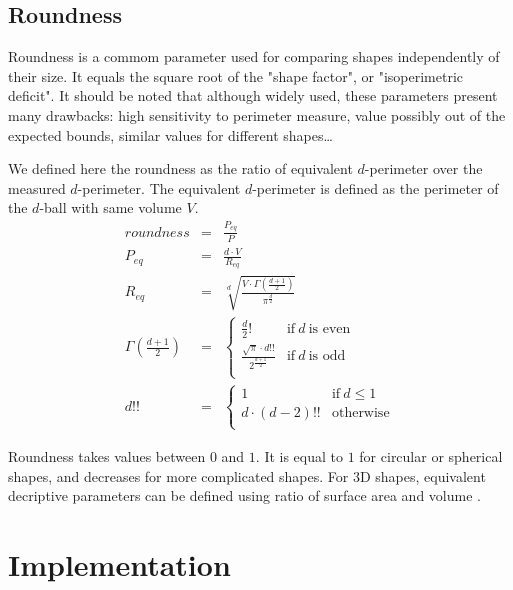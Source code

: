\documentclass{InsightArticle}
\begin{document}
\subsection{Roundness}

Roundness is a commom parameter used for comparing shapes independently of their size.
It equals the square root of the "shape factor", or "isoperimetric deficit".
It should be noted that although widely used, these parameters present many drawbacks: 
high sensitivity to perimeter measure, 
value possibly out of the expected bounds, similar values for different shapes\cite{Pirard2005}…

We defined here the roundness as the ratio of equivalent $d$-perimeter over the measured $d$-perimeter. 
The equivalent $d$-perimeter is defined as the perimeter of the $d$-ball with same volume $V$.
\begin{eqnarray}
roundness             & = & \frac{P_{eq}}{P} \\
P_{eq}                & = & \frac{d \cdot V}{R_{eq}} \\
R_{eq}                & = & \sqrt[\displaystyle d]{\frac{V\cdot\Gamma(\frac{d+1}{2})}{\pi^\frac{d}{2}}} \\
\Gamma(\frac{d+1}{2}) & = & \begin{cases}
                               \displaystyle \frac{d}{2}!  &\text{if}~ d ~\text{is even} \\
                               \displaystyle \frac{\sqrt{\pi} \cdot d!!}{2^{\frac{d+1}{2}}}  &\text{if}~ d ~\text{is odd} \\
                            \end{cases} \\
d!!                   & = & \begin{cases}
                                1 &\text{if}~ d \leq 1 \\
                                d \cdot (d-2)!!  & \text{otherwise} \\
                             \end{cases}
\end{eqnarray}


Roundness takes values between $0$ and $1$. 
It is equal to $1$ for circular or spherical shapes, and decreases for more complicated shapes.
For 3D shapes, equivalent decriptive parameters can be defined using ratio of surface area and volume \cite{Andrey2010}.


\section{Implementation}
\end{document}
